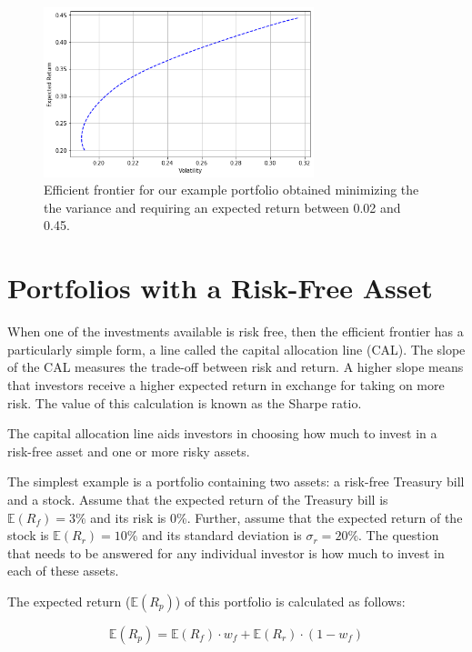 \begin{figure}[htb]
\centering
\includegraphics[width=0.7\textwidth]{figures/efficient_frontier.png}
\caption{Efficient frontier for our example portfolio obtained minimizing the the variance and requiring an expected return between 0.02 and 0.45.}
\label{fig:efficient_frontier}
\end{figure}
    
\section{Portfolios with a Risk-Free
Asset}\label{portfolios-with-a-risk-free-asset}

When one of the investments available is risk free, then the efficient
frontier has a particularly simple form, a line called the capital
allocation line (CAL). The slope of the CAL measures the trade-off
between risk and return. A higher slope means that investors receive a
higher expected return in exchange for taking on more risk. The value of
this calculation is known as the Sharpe ratio.

The capital allocation line aids investors in choosing how much to
invest in a risk-free asset and one or more risky assets.

The simplest example is a portfolio containing two assets: a risk-free
Treasury bill and a stock. Assume that the expected return of the
Treasury bill is \(\mathbb{E}(R_f)=3\%\) and its risk is 0\%. Further, assume that
the expected return of the stock is \(\mathbb{E}(R_r)=10\%\) and its standard
deviation is \(\sigma_r=20\%\). The question that needs to be answered
for any individual investor is how much to invest in each of these
assets.

The expected return (\(\mathbb{E}(R_p)\)) of this portfolio is calculated as
follows:

\[ \mathbb{E}(R_p) = \mathbb{E}(R_f)\cdot w_f + \mathbb{E}(R_r)\cdot (1- w_f) \]

